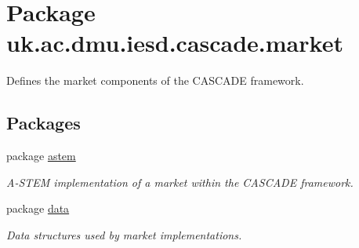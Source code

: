 \hypertarget{namespaceuk_1_1ac_1_1dmu_1_1iesd_1_1cascade_1_1market}{\section{Package uk.\-ac.\-dmu.\-iesd.\-cascade.\-market}
\label{namespaceuk_1_1ac_1_1dmu_1_1iesd_1_1cascade_1_1market}
}


Defines the market components of the C\-A\-S\-C\-A\-D\-E framework.  


\subsection*{Packages}
\begin{DoxyCompactItemize}
\item 
package \hyperlink{namespaceuk_1_1ac_1_1dmu_1_1iesd_1_1cascade_1_1market_1_1astem}{astem}
\begin{DoxyCompactList}\small\item\em A-\/\-S\-T\-E\-M implementation of a market within the C\-A\-S\-C\-A\-D\-E framework. \end{DoxyCompactList}\item 
package \hyperlink{namespaceuk_1_1ac_1_1dmu_1_1iesd_1_1cascade_1_1market_1_1data}{data}
\begin{DoxyCompactList}\small\item\em Data structures used by market implementations. \end{DoxyCompactList}\end{DoxyCompactItemize}
